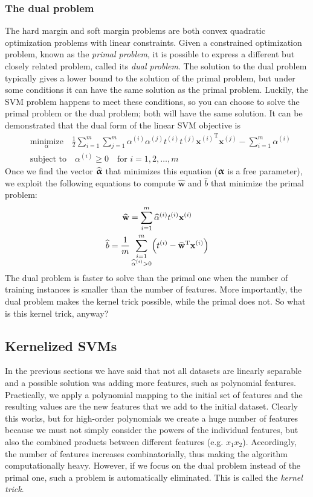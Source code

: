 \subsubsection{The dual problem}
The hard margin and soft margin problems are both convex quadratic optimization problems with linear constraints. Given a constrained optimization problem, known as the \emph{primal problem}, it is possible to express a different but closely related problem, called its \emph{dual problem}. The solution to the dual problem typically gives a lower bound to the solution of the primal problem, but under some conditions it can have the same solution as the primal problem. Luckily, the SVM problem happens to meet these conditions, so you can choose to solve the primal problem or the dual problem; both will have the same solution. It can be demonstrated that the dual form of the linear SVM objective is
\begin{align*}
&\underset{\alpha}{\text{minimize}}\quad\frac{1}{2}\sum_{i=1}^m\sum_{j=1}^m\alpha^{(i)}\alpha^{(j)}t^{(i)}t^{(j)}{\mathbf{x}^{(i)}}^{\mathrm{T}}\mathbf{x}^{(j)}-\sum_{i=1}^m\alpha^{(i)}\\
&\text{subject to}\quad\alpha^{(i)}\geq0\quad\text{for $i=1,2,\ldots,m$}
\end{align*}
Once we find the vector $\widehat{\boldsymbol{\upalpha}}$ that minimizes this equation ($\boldsymbol{\upalpha}$ is a free parameter), we exploit the following equations to compute $\widehat{\mathbf{w}}$ and $\widehat{b}$ that minimize the primal problem:
\begin{gather}
\widehat{\mathbf{w}}=\sum_{i=1}^m\widehat{\alpha}^{(i)}t^{(i)}\mathbf{x}^{(i)}\\
\widehat{b}=\frac{1}{m}\sum_{\substack{i=1\vspace{0.35pt}\\ \widehat{\alpha}^{(i)}>0}}^m\Bigl(t^{(i)}-\widehat{\mathbf{w}}^{\mathrm{T}}\mathbf{x}^{(i)}\Bigr)
\end{gather}
The dual problem is faster to solve than the primal one when the number of training instances is smaller than the number of features. More importantly, the dual problem makes the kernel trick possible, while the primal does not. So what is this kernel trick, anyway?
\subsection{Kernelized SVMs}\label{sec:Kernelized_SVMs}
In the previous sections we have said that not all datasets are linearly separable and a possible solution was adding more features, such as polynomial features. Practically, we apply a polynomial mapping to the initial set of features and the resulting values are the new features that we add to the initial dataset. Clearly this works, but for high-order polynomials we create a huge number of features because we must not simply consider the powers of the individual features, but also the combined products between different features (e.g. $x_1x_2$). Accordingly, the number of features increases combinatorially, thus making the algorithm computationally heavy. However, if we focus on the dual problem instead of the primal one, such a problem is automatically eliminated. This is called the \emph{kernel trick}.

